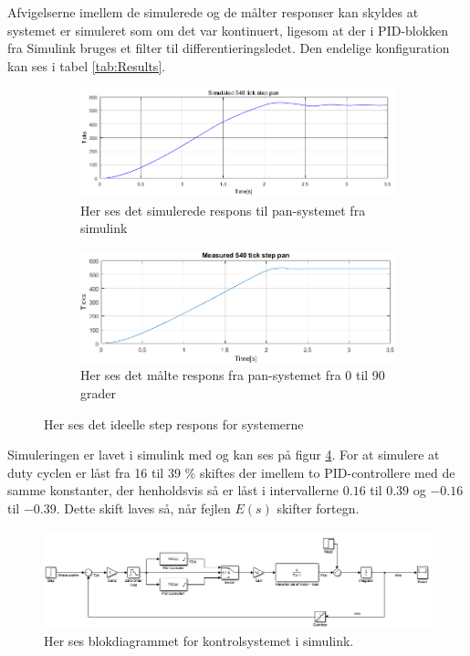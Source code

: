 Afvigelserne imellem de simulerede og de målter responser kan skyldes at systemet er simuleret som om det var kontinuert, ligesom at der i PID-blokken fra Simulink bruges et filter til differentieringsledet. Den endelige konfiguration kan ses i tabel \ref{tab:Results}.

\begin{figure}[t!]
    \centering
    \begin{subfigure}[t]{0.8\textwidth}
     \centering
        \includegraphics[width=1\textwidth]{Billeder/Simulated_Response_Pan.png}
        \caption{Her ses det simulerede respons til pan-systemet fra simulink}
        \label{fig:Simulated_Pan}
    \end{subfigure}
    \begin{subfigure}[b]{0.8\textwidth}
     \centering
        \includegraphics[width=1\textwidth]{Billeder/Measured_Response_Pan.PNG}
        \caption{Her ses det målte respons fra pan-systemet fra 0 til 90 grader}
        \label{fig:Measured_Pan}
    \end{subfigure}
    \caption{Her ses det ideelle step respons for systemerne}
\end{figure}

Simuleringen er lavet i simulink med og kan ses på figur \ref{fig:Simulink}. For at simulere at duty cyclen er låst fra 16 til 39 $\%$ skiftes der imellem to PID-controllere med de samme konstanter, der henholdsvis så er låst i intervallerne $0.16$ til $0.39$ og $-0.16$ til $-0.39$. Dette skift laves så, når fejlen $E(s)$ skifter fortegn.

\begin{figure}
\centering
        \includegraphics[width=1\textwidth]{Billeder/Simulink.PNG}
        \caption{Her ses blokdiagrammet for kontrolsystemet i simulink.}
        \label{fig:Simulink}
\end{figure}

